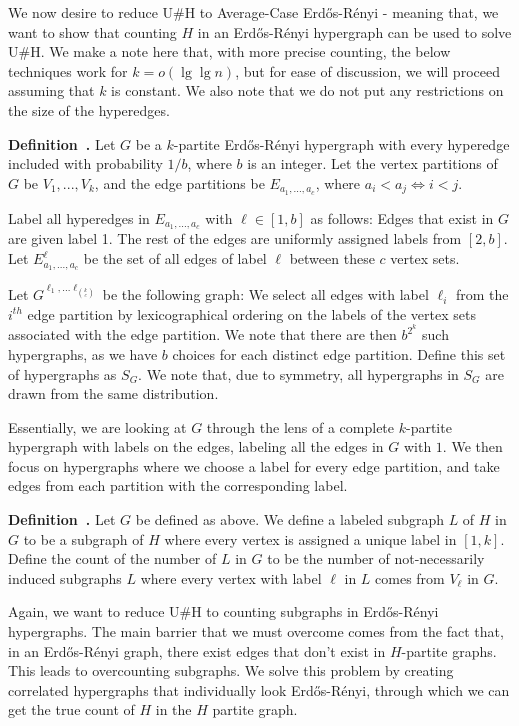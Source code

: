 \documentclass[11pt,letterpaper,pdftex]{article}
\newcounter{definition}
\newenvironment{definition}[1][]{\refstepcounter{definition}\par\medskip
   \noindent \textbf{Definition~\thedefinition. #1} \rmfamily}{\medskip}
\def\edgepartitionc{E_{a_1,...,a_c}}
\def\gchosenlabels{G^{\ell_1,...\ell_{\binom{k}{c}}}}
\begin{document}
We now desire to reduce U\#H to Average-Case Erd{\H{o}}s-R{\'{e}}nyi - meaning that, we want to show that counting $H$ in an Erd{\H{o}}s-R{\'{e}}nyi hypergraph can be used to solve U\#H. We make a note here that, with more precise counting, the below techniques work for $k = o(\lg\lg n)$, but for ease of discussion, we will proceed assuming that $k$ is constant. We also note that we do not put any restrictions on the size of the hyperedges. 

\begin{definition}
Let $G$ be a $k$-partite Erd{\H{o}}s-R{\'{e}}nyi hypergraph with every hyperedge included with probability $1/b$, where $b$ is an integer. Let the vertex partitions of $G$ be $V_1,...,V_k$, and the edge partitions be $\edgepartitionc$, where $a_i < a_j \iff i < j$.

Label all hyperedges in $\edgepartitionc$ with $\ell\in[1,b]$ as follows: Edges that exist in $G$ are given label 1. The rest of the edges are uniformly assigned labels from $[2,b]$. Let $\edgepartitionc^\ell$ be the set of all edges of label $\ell$ between these $c$ vertex sets.

Let $\gchosenlabels$ be the following graph: We select all edges with label $\ell_i$ from the $i^{th}$ edge partition by lexicographical ordering on the labels of the vertex sets associated with the edge partition. We note that there are then $b^{2^k}$ such hypergraphs, as we have $b$ choices for each distinct edge partition. Define this set of hypergraphs as $S_G$. We note that, due to symmetry, all hypergraphs in $S_G$ are drawn from the same distribution.
\end{definition}

Essentially, we are looking at $G$ through the lens of a complete $k$-partite hypergraph with labels on the edges, labeling all the edges in $G$ with $1$. We then focus on hypergraphs where we choose a label for every edge partition, and take edges from each partition with the corresponding label.

\begin{definition}\label{def: count labels}
Let $G$ be defined as above. We define a labeled subgraph $L$ of $H$ in $G$ to be a subgraph of $H$ where every vertex is assigned a unique label in $[1,k]$. Define the count of the number of $L$ in $G$ to be the number of not-necessarily induced subgraphs $L$ where every vertex with label $\ell$ in $L$ comes from $V_\ell$ in $G$.
\end{definition}

Again, we want to reduce U\#H to counting subgraphs in Erd{\H{o}}s-R{\'{e}}nyi hypergraphs. The main barrier that we must overcome comes from the fact that, in an Erd{\H{o}}s-R{\'{e}}nyi graph, there exist edges that don't exist in $H$-partite graphs. This leads to overcounting subgraphs. We solve this problem by creating correlated hypergraphs 
that individually look Erd{\H{o}}s-R{\'{e}}nyi, through which we can get the true count of $H$ in the $H$ partite graph.
\end{document}
